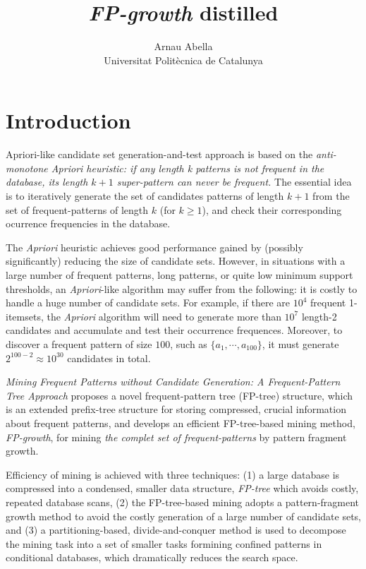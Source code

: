 \documentclass[12pt, a4paper]{article}
\title{%
  \textit{FP-growth} distilled
}
\author{%
  Arnau Abella \\
  \small{Universitat Polit\`ecnica de Catalunya}
}
\begin{document}
\maketitle

\section{Introduction}

Apriori-like candidate set generation-and-test approach is based on the \textit{anti-monotone Apriori heuristic: if any length k patterns is not frequent in the database, its length $k + 1$ super-pattern can never be frequent.} The essential idea is to iteratively generate the set of candidates patterns of length $k+1$ from the set of frequent-patterns of length $k$ (for $k \geq 1$), and check their corresponding ocurrence frequencies in the database.

The \textit{Apriori} heuristic achieves good performance gained by (possibly \\ significantly) reducing the size of candidate sets. However, in situations with a large number of frequent patterns, long patterns, or quite low minimum support thresholds, an \textit{Apriori}-like algorithm may suffer from the following: it is costly to handle a huge number of candidate sets. For example, if there are $10^4$ frequent 1-itemsets, the \textit{Apriori} algorithm will need to generate more than $10^7$ length-2 candidates and accumulate and test their occurrence frequences. Moreover, to discover a frequent pattern of size $100$, such as $\{ a_1, \cdots , a_{100}\}$, it must generate $2^{100-2} \approx 10^{30}$ candidates in total.

\textit{Mining Frequent Patterns without Candidate Generation: A Frequent-Pattern Tree Approach} \cite{han2000} proposes a novel frequent-pattern tree (FP-tree) structure, which is an extended prefix-tree structure for storing compressed, crucial information about frequent patterns, and develops an efficient FP-tree-based mining method, \textit{FP-growth}, for mining \textit{the complet set of frequent-patterns} by pattern fragment growth.

Efficiency of mining is achieved with three techniques: (1) a large database is compressed into a condensed, smaller data structure, \textit{FP-tree} which avoids costly, repeated database scans, (2) the FP-tree-based mining adopts a pattern-fragment growth method to avoid the costly generation of a large number of candidate sets, and (3) a partitioning-based, divide-and-conquer method is used to decompose the mining task into a set of smaller tasks formining confined patterns in conditional databases, which dramatically reduces the search space.
\end{document}
